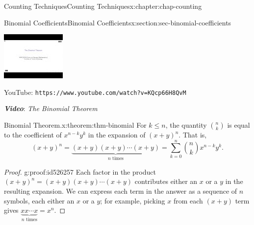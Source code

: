 \documentclass[oneside,10pt,]{book}
\newcommand{\mono}[1]{\texttt{#1}}
\newcommand{\alert}[1]{\textbf{\textit{#1}}}
\numberwithin{equation}{section}
\newlength{\qrsize}
\newlength{\previewwidth}
\begin{document}
\begin{chapterptx}{Counting Techniques}{}{Counting Techniques}{}{}{x:chapter:chap-counting}
\begin{sectionptx}{Binomial Coefficients}{}{Binomial Coefficients}{}{}{x:section:sec-binomial-coefficients}
\begin{sidebyside}{1}{0}{0}{0}
\begin{sbspanel}{1}
\begin{tcbraster}[raster columns=2, raster column skip=1pt, raster halign=center, raster force size=false, raster left skip=0pt, raster right skip=0pt]
\begin{tcolorbox}[previewstyle, width=\previewwidth]%
\includegraphics[width=0.80\linewidth,height=\qrsize,keepaspectratio]{images/video-binomial-theorem.jpg}%
\end{tcolorbox}%
\begin{tcolorbox}[qrstyle]%
{\hypersetup{urlcolor=black}}%
\end{tcolorbox}%
\begin{tcolorbox}[captionstyle]%
\small YouTube: \mono{https://www.youtube.com/watch?v=KQcp66H8QvM}\end{tcolorbox}%
\end{tcbraster}%
\end{sbspanel}%
\end{sidebyside}%
\par
\alert{Video}: \emph{The Binomial Theorem}%
\begin{theorem}{Binomial Theorem.}{}{x:theorem:thm-binomial}%
For \(k \leq n\), the quantity \(\displaystyle\binom{n}{k}\) is equal to the coefficient of \(x^{n-k}y^k\) in the expansion of \((x+y)^n\). That is,%
\begin{equation*}
(x+y)^n = \underbrace{(x+y)(x+y)\cdots(x+y)}_\text{$n$ times} = \displaystyle\sum_{k=0}^n \binom{n}{k}x^{n-k}y^k\text{.}
\end{equation*}
%
\end{theorem}
\begin{proof}{}{g:proof:id526257}
Each factor in the product \((x+y)^n = (x+y)(x+y)\cdots(x+y)\) contributes either an \(x\) or a \(y\) in the resulting expansion. We can express each term in the answer as a sequence of \(n\) symbols, each either an \(x\) or a \(y\); for example, picking \(x\) from each \((x+y)\) term gives \(\underbrace{xx\cdots x}_\text{$n$ times}=x^n\).%

\end{proof}
\end{sectionptx}
\end{chapterptx}
\end{document}
